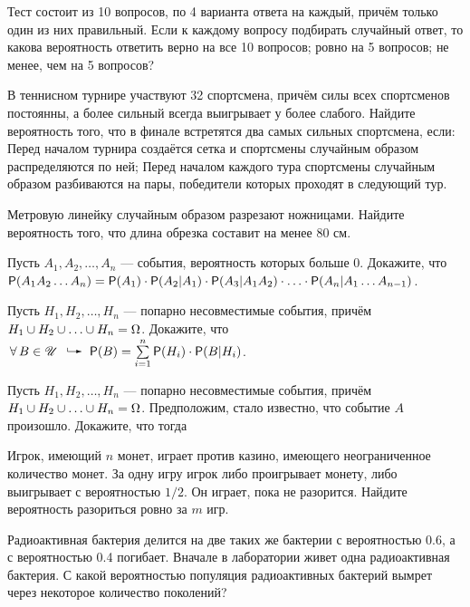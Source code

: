 \documentclass[a4paper,12pt]{article}
\def\exec{\makebox[25pt]{\put(-5,3){\line(0,1){3}}\put(-5,3){\vector(1,0){11}}}}
\begin{document}
  Тест состоит из 10 вопросов, по 4 варианта ответа на каждый, причём только один из них правильный. Если к каждому вопросу подбирать случайный ответ, то какова вероятность ответить верно  на все 10 вопросов;  ровно на 5 вопросов;  не менее, чем на 5 вопросов?

  В теннисном турнире участвуют 32 спортсмена, причём силы всех спортсменов постоянны, а более сильный всегда выигрывает у более слабого. Найдите вероятность того, что в финале встретятся два самых сильных спортсмена, если:
     Перед началом турнира создаётся сетка и спортсмены случайным образом распределяются по ней;
     Перед началом каждого тура спортсмены случайным образом разбиваются на пары, победители которых проходят в следующий тур.

  Метровую линейку случайным образом разрезают ножницами. Найдите вероятность того, что длина обрезка составит на менее 80 см.

  Пусть $A_1, A_2,\ldots, A_n$ --- события, вероятность которых больше 0. Докажите, что $\mathsf{P}(A_1A_2\ldots A_n)=\mathsf{P}(A_1)\cdot\mathsf{P}(A_2|A_1)\cdot\mathsf{P}(A_3|A_1A_2)\cdot\ldots\cdot\mathsf{P}(A_n|A_1\ldots A_{n-1})$.

  Пусть $H_1,H_2,\ldots,H_n$ --- попарно несовместимые события, причём $H_1\cup H_2\cup\ldots\cup H_n=\Omega$. Докажите, что $\fa B\in\Us\exec\Pf(B)=\sum\limits_{i=1}^n\Pf(H_i)\cdot\Pf(B|H_i)$.


  Пусть \hfill $H_1,H_2,\ldots,H_n$ \hfill --- \hfill попарно \hfill несовместимые \hfill события, \hfill причём\\$H_1\cup H_2\cup\ldots\cup H_n=\Omega$. Предположим, стало известно, что событие $A$ произошло. Докажите, что тогда 

Игрок, имеющий $n$ монет, играет против казино, имеющего неограниченное количество монет. За одну игру игрок либо проигрывает монету, либо выигрывает с вероятностью $1/2$. Он играет, пока не разорится. Найдите вероятность разориться ровно за $m$ игр.


Радиоактивная бактерия делится на две таких же бактерии с вероятностью 0.6, а с вероятностью 0.4 погибает. Вначале в лаборатории живет одна радиоактивная бактерия. С какой вероятностью
популяция радиоактивных бактерий вымрет через некоторое количество поколений?
\end{document}
